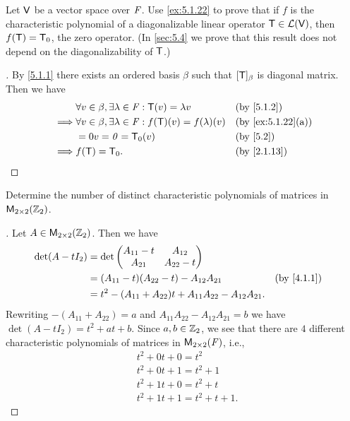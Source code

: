 \begin{ex}\label{ex:5.1.23}
  Let \(\mathsf{V}\) be a vector space over \(\mathit{F}\).
  Use \cref{ex:5.1.22} to prove that if \(f\) is the characteristic polynomial of a diagonalizable linear operator \(\mathsf{T} \in \mathcal{L}(\mathsf{V})\), then \(f(\mathsf{T}) = \mathsf{T}_0\), the zero operator.
  (In \cref{sec:5.4} we prove that this result does not depend on the diagonalizability of \(\mathsf{T}\).)
\end{ex}

\begin{proof}[]
  By \cref{5.1.1} there exists an ordered basis \(\beta\) such that \([\mathsf{T}]_{\beta}\) is diagonal matrix.
  Then we have
  \begin{align*}
             & \forall v \in \beta, \exists \lambda \in \F : \T(v) = \lambda v        &  & \by{5.1.2}        \\
    \implies & \forall v \in \beta, \exists \lambda \in \F : f(\T)(v) = f(\lambda)(v) &  & \by{ex:5.1.22}[a] \\
             & = 0v = \zv = \zT(v)                                                    &  & \by{5.2}          \\
    \implies & f(\T) = \zT.                                                           &  & \by{2.1.13}
  \end{align*}
\end{proof}

\setcounter{ex}{25}
\begin{ex}\label{ex:5.1.26}
  Determine the number of distinct characteristic polynomials of matrices in \(\ms[2][2][\Z_2]\).
\end{ex}

\begin{proof}[]
  Let \(A \in \ms[2][2][\Z_2]\).
  Then we have
  \begin{align*}
    \det(A - t I_2) & = \det\begin{pmatrix}
                              A_{1 1} - t & A_{1 2}     \\
                              A_{2 1}     & A_{2 2} - t
                            \end{pmatrix}                                                    \\
                    & = (A_{1 1} - t) (A_{2 2} - t) - A_{1 2} A_{2 1}                    &  & \by{4.1.1} \\
                    & = t^2 - (A_{1 1} + A_{2 2}) t + A_{1 1} A_{2 2} - A_{1 2} A_{2 1}.
  \end{align*}
  Rewriting \(-(A_{1 1} + A_{2 2}) = a\) and \(A_{1 1} A_{2 2} - A_{1 2} A_{2 1} = b\) we have \(\det(A - t I_2) = t^2 + at + b\).
  Since \(a, b \in \mathbb{Z}_2\), we see that there are \(4\) different characteristic polynomials of matrices in \(\ms[2][2][\F]\), i.e.,
  \begin{align*}
     & t^2 + 0t + 0 = t^2          \\
     & t^2 + 0t + 1 = t^2 + 1      \\
     & t^2 + 1t + 0 = t^2 + t      \\
     & t^2 + 1t + 1 = t^2 + t + 1.
  \end{align*}
\end{proof}
